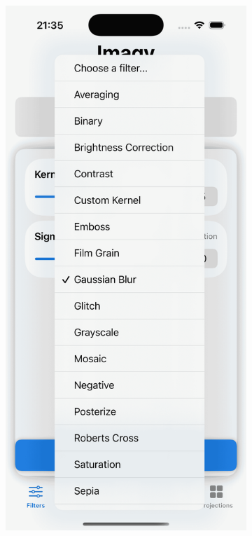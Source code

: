 \documentclass[a4paper]{article}
\begin{document}
\begin{figure}[H]
    \centering
    \begin{subfigure}{0.2\textwidth}
        \centering
        \includegraphics[width=\linewidth]{images/filter_choice.png}

\end{subfigure}
\end{figure}
\end{document}
